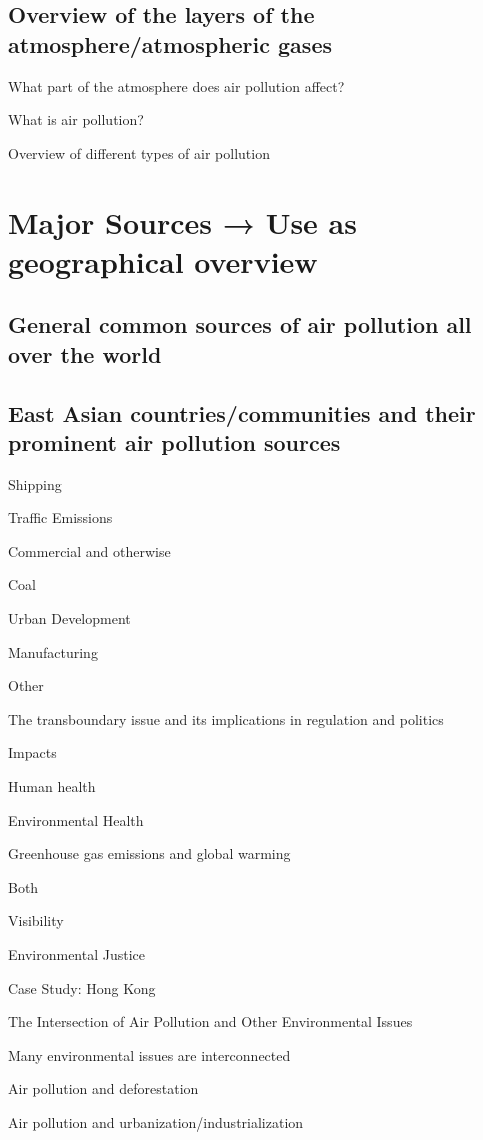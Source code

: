 \documentclass{book}\usepackage{knitr}
\begin{document}
\begin{knitrout}
\begin{kframe}
\subsection{Overview of the layers of the atmosphere/atmospheric gases}

What part of the atmosphere does air pollution affect?

What is air pollution?

Overview of different types of air pollution

\section{Major Sources → Use as geographical overview}

\subsection{General common sources of air pollution all over the world}

\subsection{East Asian countries/communities and their prominent air pollution sources}

Shipping

Traffic Emissions

Commercial and otherwise

Coal

Urban Development

Manufacturing

Other

The transboundary issue and its implications in regulation and politics

Impacts

Human health

Environmental Health

Greenhouse gas emissions and global warming

Both

Visibility

Environmental Justice

Case Study: Hong Kong

The Intersection of Air Pollution and Other Environmental Issues

Many environmental issues are interconnected

Air pollution and deforestation

Air pollution and urbanization/industrialization


\end{kframe}
\end{knitrout}
\end{document}
